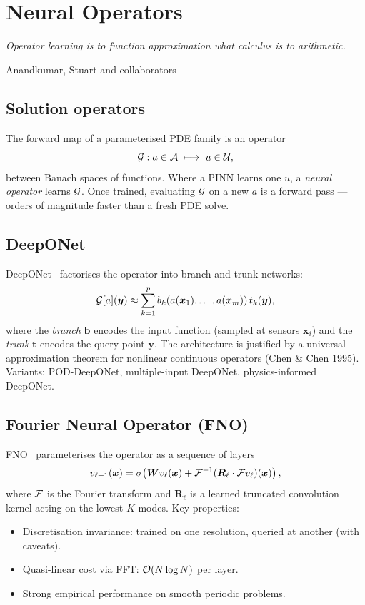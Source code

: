 \chapter{Neural Operators}
\label{ch:operators}

\epigraph{\itshape Operator learning is to function approximation what
calculus is to arithmetic.}{Anandkumar, Stuart and collaborators}

\section{Solution operators}
The forward map of a parameterised PDE family is an operator
\begin{equation}
\mathcal{G} : a\in\mathcal{A} \;\longmapsto\; u\in\mathcal{U},
\end{equation}
between Banach spaces of functions. Where a PINN learns one $u$, a
\emph{neural operator} learns $\mathcal{G}$. Once trained, evaluating $\mathcal{G}$
on a new $a$ is a forward pass --- orders of magnitude faster than a
fresh PDE solve.

\section{DeepONet}
DeepONet~\cite{lu2021deeponet} factorises the operator into branch and
trunk networks:
\begin{equation}
\mathcal{G}[a](\bm{y}) \approx \sum_{k=1}^p b_k(a(\bm{x}_1),\dots,a(\bm{x}_m))\,t_k(\bm{y}),
\end{equation}
where the \emph{branch} $\bm{b}$ encodes the input function (sampled at
sensors $\bm{x}_i$) and the \emph{trunk} $\bm{t}$ encodes the query
point $\bm{y}$. The architecture is justified by a universal
approximation theorem for nonlinear continuous operators (Chen \& Chen
1995). Variants: POD-DeepONet, multiple-input DeepONet, physics-informed
DeepONet.

\section{Fourier Neural Operator (FNO)}
\label{sec:fno}
FNO~\cite{li2021fno} parameterises the operator as a sequence of layers
\begin{equation}
v_{\ell+1}(\bm{x}) = \sigma\!\left(\bm{W}v_\ell(\bm{x}) + \mathcal{F}^{-1}(\bm{R}_\ell\cdot \mathcal{F} v_\ell)(\bm{x})\right),
\end{equation}
where $\mathcal{F}$ is the Fourier transform and $\bm{R}_\ell$ is a learned
truncated convolution kernel acting on the lowest $K$ modes. Key
properties:
\begin{itemize}
\item Discretisation invariance: trained on one resolution, queried at
another (with caveats).
\item Quasi-linear cost via FFT: $\mathcal{O}(N\log N)$ per layer.
\item Strong empirical performance on smooth periodic problems.
\end{itemize}

